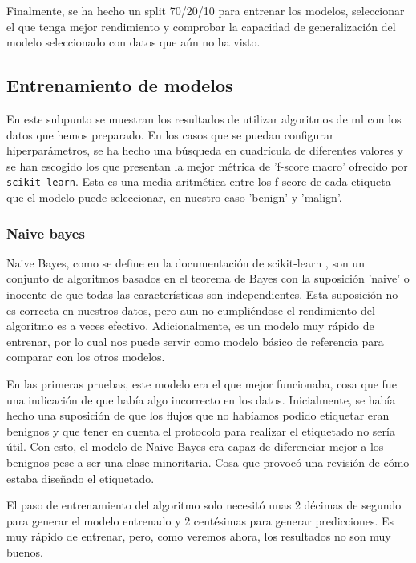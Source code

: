 Finalmente, se ha hecho un split 70/20/10 para entrenar los modelos, seleccionar el que tenga mejor rendimiento y comprobar la capacidad de generalización del modelo seleccionado con datos que aún no ha visto. 

\subsection{Entrenamiento de modelos}

En este subpunto se muestran los resultados de utilizar algoritmos de \gls{ml} con los datos que hemos preparado. En los casos que se puedan configurar hiperparámetros, se ha hecho una búsqueda en cuadrícula de diferentes valores y se han escogido los que presentan la mejor métrica de  'f-score macro' ofrecido por \texttt{scikit-learn}. Esta es una media aritmética entre los f-score de cada etiqueta que el modelo puede seleccionar, en nuestro caso 'benign' y 'malign'.

\subsubsection{Naive bayes}

Naive Bayes, como se define en la documentación de scikit-learn \cite{sklearnnaivebayes}, son un conjunto de algoritmos basados en el teorema de Bayes con la suposición 'naive' o inocente de que todas las características son independientes. Esta suposición no es correcta en nuestros datos, pero aun no cumpliéndose el rendimiento del algoritmo es a veces efectivo. Adicionalmente, es un modelo muy rápido de entrenar, por lo cual nos puede servir como modelo básico de referencia para comparar con los otros modelos. 

En las primeras pruebas, este modelo era el que mejor funcionaba, cosa que fue una indicación de que había algo incorrecto en los datos. Inicialmente, se había hecho una suposición de que los flujos que no habíamos podido etiquetar eran benignos y que tener en cuenta el protocolo para realizar el etiquetado no sería útil. Con esto, el modelo de Naive Bayes era capaz de diferenciar mejor a los benignos pese a ser una clase minoritaria. Cosa que provocó una revisión de cómo estaba diseñado el etiquetado.

El paso de entrenamiento del algoritmo solo necesitó unas 2 décimas de segundo para generar el modelo entrenado y 2 centésimas para generar predicciones. Es muy rápido de entrenar, pero, como veremos ahora, los resultados no son muy buenos.

